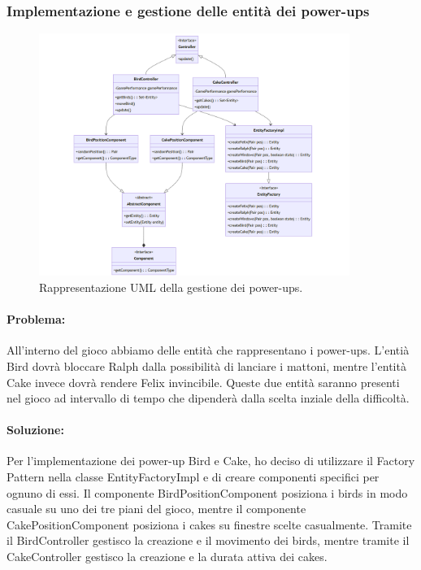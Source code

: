 \documentclass[a4paper,12pt]{report}
\begin{document}
\subsubsection{Implementazione e gestione delle entità dei power-ups}

\begin{figure}[H]
\centering{}
\includegraphics[width=0.9\textwidth]{img/powerups.png}
\caption{Rappresentazione UML della gestione dei power-ups.}
\end{figure}

\paragraph{Problema:}
All'interno del gioco abbiamo delle entità che rappresentano i power-ups. 
L'entià Bird dovrà bloccare Ralph dalla possibilità di lanciare i mattoni, mentre l'entità Cake invece dovrà rendere Felix invincibile. 
Queste due entità saranno presenti nel gioco ad intervallo di tempo che dipenderà dalla scelta inziale della difficoltà. 

\paragraph{Soluzione:}
Per l'implementazione dei power-up Bird e Cake, ho deciso di utilizzare il Factory Pattern nella classe EntityFactoryImpl e di creare componenti specifici per ognuno di essi. 
Il componente BirdPositionComponent posiziona i birds in modo casuale su uno dei tre piani del gioco, mentre il componente CakePositionComponent posiziona i cakes su finestre scelte casualmente. 
Tramite il BirdController gestisco la creazione e il movimento dei birds, mentre tramite il CakeController gestisco la creazione e la durata attiva dei cakes.
\end{document}
